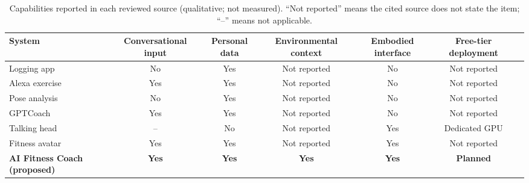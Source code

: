\begin{table}[t]
\caption{Capabilities reported in each reviewed source (qualitative; not measured). ``Not reported'' means the cited source does not state the item; ``--'' means not applicable.}
\label{tab:comparison}
\centering
\footnotesize
\begin{tabular}{lcccccc}
\toprule
System & Conversational input & Personal data & Environmental context & Embodied interface & Free-tier deployment \\
\midrule
Logging app \cite{rayward2021} & No & Yes & Not reported & No & Not reported \\
Alexa exercise \cite{jansons2022} & Yes & Yes & Not reported & No & Not reported \\
Pose analysis \cite{young2023} & No & Yes & Not reported & No & Not reported \\
GPTCoach \cite{jorke2024} & Yes & Yes & Not reported & No & Not reported \\
Talking head \cite{liu2025livatar} & -- & No & Not reported & Yes & Dedicated GPU \\
Fitness avatar \cite{memisevic2019millie} & Yes & Yes & Not reported & Yes & Not reported \\
\textbf{AI Fitness Coach (proposed)} & \textbf{Yes} & \textbf{Yes} & \textbf{Yes} & \textbf{Yes} & \textbf{Planned} \\
\bottomrule
\end{tabular}
\end{table}
